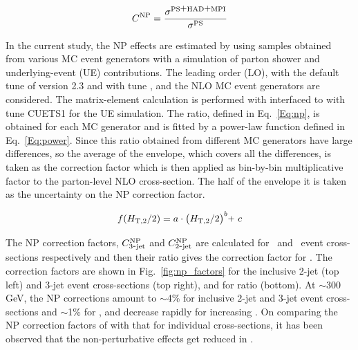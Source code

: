 \begin{equation}
 \label{Eq:np}
 C^{\rm NP} = \frac{\sigma^{\rm PS \plusn HAD \plusn MPI}}{\sigma^{\rm PS}}
\end{equation}

In the current study, the NP effects are estimated by using samples obtained from various MC event generators with a simulation of parton shower and underlying-event (UE) contributions. The leading order (LO), \HERWIGPP with the default tune of version 2.3 and \PYTHIAS with tune \Ztwostar, and the NLO \POWHEG MC event generators are considered. The matrix-element calculation is performed with \POWHEG interfaced to \PYTHIAE with tune CUETS1 for the UE simulation. The ratio, defined in Eq.~\ref{Eq:np}, is obtained for each MC generator and is fitted by a power-law function defined in Eq.~\ref{Eq:power}. Since this ratio obtained from different MC generators have large differences, so the average of the envelope, which covers all the differences, is taken as the correction factor which is then applied as bin-by-bin multiplicative factor to the parton-level NLO cross-section. The half of the envelope it is taken as the uncertainty on the NP correction factor. 

\begin{equation}
 \label{Eq:power}
 f(\httwo) = a\cdot\big(\httwo\big)^{b}\plus c
\end{equation}

The NP correction factors, $C_{\rm 3\mbox{-} jet}^{\rm NP}$ and $C_{\rm 2\mbox{-} jet}^{\rm NP}$ are calculated for \njt~and \njth~event cross-sections respectively and then their ratio gives the correction factor for \ratio . The correction factors are shown in Fig.~\ref{fig:np_factors} for the inclusive 2-jet (top left) and 3-jet event cross-sections (top right), and for ratio \ratio (bottom). At \httwo $\sim$300 GeV, the NP corrections amount to $\sim$4\% for inclusive 2-jet and 3-jet event cross-sections and $\sim$1\% for \ratio, and decrease rapidly for increasing \httwo. On comparing the NP correction factors of \ratio with that for individual cross-sections, it has been observed that the non-perturbative effects get reduced in \ratio.

